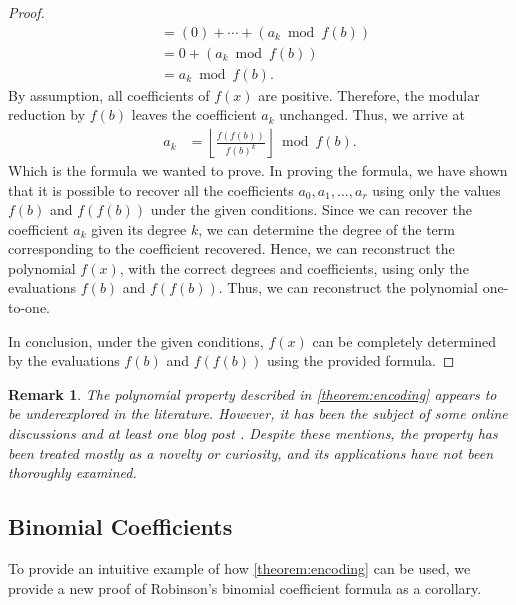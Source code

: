 \documentclass{article}
\theoremstyle{plain}
\newtheorem{remark}{Remark}[section]
\newcommand{\floor}[1]{\left\lfloor #1 \right\rfloor}
\begin{document}
\begin{proof}
\begin{align*}
&= (0) + \cdots + (a_{k} \bmod{f(b)}) \\
&= 0 + (a_{k} \bmod{f(b)}) \\
&= a_{k} \bmod{f(b)} .
\end{align*}
By assumption, all coefficients of $f(x)$ are positive. Therefore, the modular reduction by $f(b)$ leaves the coefficient $a_k$ unchanged. Thus, we arrive at
\begin{align*}
a_k &= \floor{\frac{f(f(b))}{f(b)^{k}}} \bmod{f(b)} .
\end{align*}
Which is the formula we wanted to prove. In proving the formula, we have shown that it is possible to recover all the coefficients $a_0, a_1, \ldots, a_r$ using only the values $f(b)$ and $f(f(b))$ under the given conditions. Since we can recover the coefficient $a_k$ given its degree $k$, we can determine the degree of the term corresponding to the coefficient recovered. Hence, we can reconstruct the polynomial $f(x)$, with the correct degrees and coefficients, using only the evaluations $f(b)$ and $f(f(b))$. Thus, we can reconstruct the polynomial one-to-one.

In conclusion, under the given conditions, $f(x)$ can be completely determined by the evaluations $f(b)$ and $f(f(b))$ using the provided formula.
\end{proof}

\begin{remark}
The polynomial property described in \cref{theorem:encoding} appears to be underexplored in the literature. However, it has been the subject of some online discussions \cite{mathoverflow2012application, reddit2023determine} and at least one blog post \cite{jcook2012polynomial}. Despite these mentions, the property has been treated mostly as a novelty or curiosity, and its applications have not been thoroughly examined.
\end{remark}

\subsection{Binomial Coefficients}
To provide an intuitive example of how \cref{theorem:encoding} can be used, we provide a new proof of Robinson's binomial coefficient formula \cite{robinson1952arithmetic} as a corollary.
\end{document}
